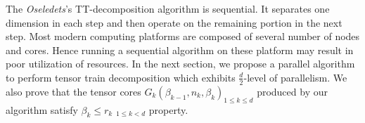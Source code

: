 \documentclass[runningheads]{llncs}
\newcommand{\tensor}[1]{\cal\textbf{#1}\xspace}
\begin{document}

The \textit{Oseledets}'s TT-decomposition algorithm is sequential. It separates one dimension in each step and then operate on the remaining portion in the next step. Most modern computing platforms are composed of several number of nodes and cores. Hence running a sequential algorithm on these platform may result in poor utilization of resources. In the next section, we propose a parallel algorithm to perform tensor train decomposition which exhibits $\frac{d}{2}$-level of parallelism. We also prove that the tensor cores $G_k(\beta_{k-1}, n_k, \beta_k) _{1\le k\le d}$ produced by our algorithm satisfy $\beta_k \le r_k$ $_{1\le k < d}$ property.
  
\end{document}
